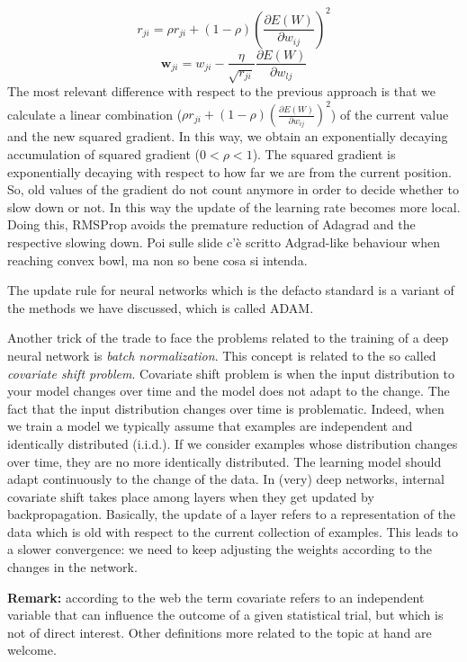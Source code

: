 \[
	r_{ji}= \rho r_{ji}+ (1 - \rho) (\frac{\partial E(W)}{\partial w_{ij}})^{2}
\]
\[
	\pmb{w}_{ji}= w_{ji}- \frac{\eta}{\sqrt{r_{ji}}}\frac{\partial E(W)}{\partial
	w_{lj}}
\]
The most relevant difference with respect to the previous approach is that we calculate
a linear combination ($\rho r_{ji}+ (1 - \rho) (\frac{\partial E(W)}{\partial w_{ij}}
)^{2}$) of the current value and the new squared gradient. In this way, we obtain
an exponentially decaying accumulation of squared gradient ($0<\rho<1$). The
squared gradient is exponentially decaying with respect to how far we are from
the current position. So, old values of the gradient do not count anymore in
order to decide whether to slow down or not. In this way the update of the learning
rate becomes more local. Doing this, RMSProp avoids the premature reduction of Adagrad
and the respective slowing down. Poi sulle slide c'è scritto Adgrad-like
behaviour when reaching convex bowl, ma non so bene cosa si intenda.
\newline

The update rule for neural networks which is the defacto standard is a variant of
the methods we have discussed, which is called ADAM.
\newline

Another trick of the trade to face the problems related to the training of a
deep neural network is \textit{batch normalization}. This concept is related to
the so called \textit{covariate shift problem}. Covariate shift problem is when
the input distribution to your model changes over time and the model does not
adapt to the change. The fact that the input distribution changes over time is problematic.
Indeed, when we train a model we typically assume that examples are independent and
identically distributed (i.i.d.). If we consider examples whose distribution changes
over time, they are no more identically distributed. The learning model should adapt
continuously to the change of the data. In (very) deep networks, internal covariate
shift takes place among layers when they get updated by backpropagation.
Basically, the update of a layer refers to a representation of the data which is
old with respect to the current collection of examples. This leads to a slower
convergence: we need to keep adjusting the weights according to the changes in the
network.
\newline

\textbf{Remark:} according to the web the term covariate refers to an
independent variable that can influence the outcome of a given statistical trial,
but which is not of direct interest. Other definitions more related to the topic
at hand are welcome.
\newline

